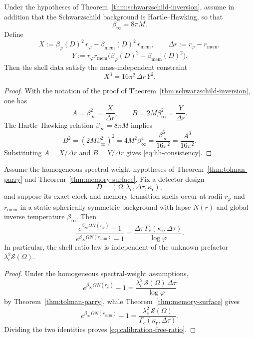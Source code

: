\begin{corollary}\label{cor:schwarzschild-hh-consistency}
Under the hypotheses of Theorem~\ref{thm:schwarzschild-inversion}, assume in addition that the Schwarzschild background is Hartle--Hawking, so that
\[
\beta_\infty=8\pi M.
\]
Define
\[
X:=\beta_\varphi(D)^2\,r_\varphi-\beta_{\mathrm{mem}}(D)^2\,r_{\mathrm{mem}},
\qquad
\Delta r:=r_\varphi-r_{\mathrm{mem}},
\]
\[
Y:=r_\varphi r_{\mathrm{mem}}
\bigl(\beta_\varphi(D)^2-\beta_{\mathrm{mem}}(D)^2\bigr).
\]
Then the shell data satisfy the mass-independent constraint
\begin{equation}\label{eq:hh-consistency}
X^3=16\pi^2\,\Delta r\,Y^2.
\end{equation}
\end{corollary}

\begin{proof}
With the notation of the proof of Theorem~\ref{thm:schwarzschild-inversion}, one has
\[
A=\beta_\infty^2=\frac{X}{\Delta r},
\qquad
B=2M\beta_\infty^2=\frac{Y}{\Delta r}.
\]
The Hartle--Hawking relation $\beta_\infty=8\pi M$ implies
\[
B^2=(2M\beta_\infty^2)^2=4M^2\beta_\infty^4=\frac{\beta_\infty^6}{16\pi^2}=\frac{A^3}{16\pi^2}.
\]
Substituting $A=X/\Delta r$ and $B=Y/\Delta r$ gives \eqref{eq:hh-consistency}.
\end{proof}

\begin{theorem}\label{thm:calibration-free-ratio}
Assume the homogeneous spectral-weight hypotheses of Theorem~\ref{thm:tolman-parry} and Theorem~\ref{thm:memory-surface}. Fix a detector design
\[
D=(\Omega,\lambda_c,\Delta\tau,\kappa_{\mathrm r}),
\]
and suppose its exact-clock and memory-transition shells occur at radii $r_\varphi$ and $r_{\mathrm{mem}}$ in a static spherically symmetric background with lapse $N(r)$ and global inverse temperature $\beta_\infty$. Then
\begin{equation}\label{eq:calibration-free-ratio}
\frac{e^{\beta_\infty\Omega N(r_\varphi)}-1}
     {e^{\beta_\infty\Omega N(r_{\mathrm{mem}})}-1}
=
\frac{\Delta\tau\,\Gamma_c(\kappa_{\mathrm r},\Delta\tau)}{\log\varphi}.
\end{equation}
In particular, the shell ratio law is independent of the unknown prefactor $\lambda_c^2\mathcal S(\Omega)$.
\end{theorem}

\begin{proof}
Under the homogeneous spectral-weight assumptions,
\[
e^{\beta_\infty\Omega N(r_\varphi)}-1
=
\frac{\lambda_c^2\,\mathcal S(\Omega)\,\Delta\tau}{\log\varphi}
\]
by Theorem~\ref{thm:tolman-parry}, while Theorem~\ref{thm:memory-surface} gives
\[
e^{\beta_\infty\Omega N(r_{\mathrm{mem}})}-1
=
\frac{\lambda_c^2\,\mathcal S(\Omega)}{\Gamma_c(\kappa_{\mathrm r},\Delta\tau)}.
\]
Dividing the two identities proves \eqref{eq:calibration-free-ratio}.
\end{proof}

